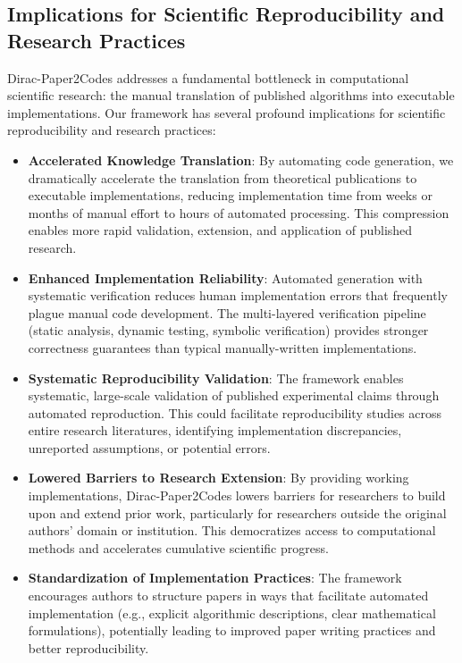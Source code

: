 \documentclass{ieeeaccess}
\begin{document}
\subsection{Implications for Scientific Reproducibility and Research Practices}
Dirac-Paper2Codes addresses a fundamental bottleneck in computational scientific research: the manual translation of published algorithms into executable implementations. Our framework has several profound implications for scientific reproducibility and research practices:

\begin{itemize}
    \item \textbf{Accelerated Knowledge Translation}: By automating code generation, we dramatically accelerate the translation from theoretical publications to executable implementations, reducing implementation time from weeks or months of manual effort to hours of automated processing. This compression enables more rapid validation, extension, and application of published research.
    
    \item \textbf{Enhanced Implementation Reliability}: Automated generation with systematic verification reduces human implementation errors that frequently plague manual code development. The multi-layered verification pipeline (static analysis, dynamic testing, symbolic verification) provides stronger correctness guarantees than typical manually-written implementations.
    
    \item \textbf{Systematic Reproducibility Validation}: The framework enables systematic, large-scale validation of published experimental claims through automated reproduction. This could facilitate reproducibility studies across entire research literatures, identifying implementation discrepancies, unreported assumptions, or potential errors.
    
    \item \textbf{Lowered Barriers to Research Extension}: By providing working implementations, Dirac-Paper2Codes lowers barriers for researchers to build upon and extend prior work, particularly for researchers outside the original authors' domain or institution. This democratizes access to computational methods and accelerates cumulative scientific progress.
    
    \item \textbf{Standardization of Implementation Practices}: The framework encourages authors to structure papers in ways that facilitate automated implementation (e.g., explicit algorithmic descriptions, clear mathematical formulations), potentially leading to improved paper writing practices and better reproducibility.
\end{itemize}
\end{document}
